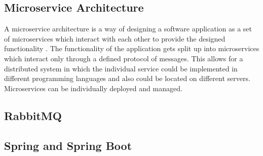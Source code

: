\subsection{Microservice Architecture}
\label{sec:microservice_architecture}
A microservice architecture is a way of designing a software application as a set of microservices which interact with each other to provide the designed functionality \cite{dragoniMicroservicesYesterdayToday2017}\cite{MicroservicesHttpsMartinfowler}.
The functionality of the application gets split up into microservices which interact only through a defined protocol of messages.
This allows for a distributed system in which the individual service could be implemented in different programming languages and also could be located on different servers.
Microservices can be individually deployed and managed.


\subsection{RabbitMQ}
\label{sec:rabbitmq}



\subsection{Spring and Spring Boot}
\label{sec:spring}






















